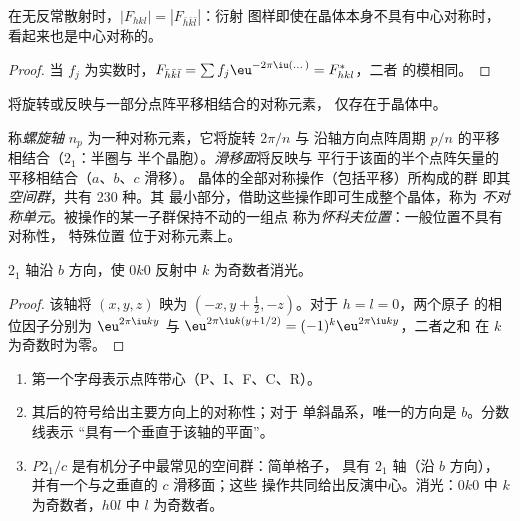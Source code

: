 \begin{proposition}[弗里德尔定律]\label{prop:b3:x-ray-diffraction:friedel}
在无反常散射时，$|F_{hkl}| = |F_{\bar h\bar k\bar l}|$：衍射
图样即使在晶体本身不具有中心对称时，看起来也是中心对称的。
\end{proposition}

\begin{proof}
当 $f_j$ 为实数时，$F_{\bar h\bar k\bar l} = \sum f_j\eu^{-2\pi\iu(\dots)} = F_{hkl}^*$，二者
的模相同。
\end{proof}

将旋转或反映与一部分点阵平移相结合的对称元素，
仅存在于晶体中。

\begin{definition}\label{def:b3:x-ray-diffraction:space-group}
称\emph{螺旋轴} $n_p$ 为一种对称元素，它将旋转 $2\pi/n$ 与
沿轴方向点阵周期 $p/n$ 的平移相结合（$2_1$：半圈与
半个晶胞）。\emph{滑移面}将反映与
平行于该面的半个点阵矢量的平移相结合（$a$、$b$、$c$ 滑移）。
晶体的全部对称操作（包括平移）所构成的群
即其\emph{空间群}，共有 230 种。其
最小部分，借助这些操作即可生成整个晶体，称为
\emph{不对称单元}。被操作的某一子群保持不动的一组点
称为\emph{怀科夫位置}：一般位置不具有对称性，
特殊位置
位于对称元素上。
\end{definition}

\begin{proposition}[螺旋轴的消光]\label{prop:b3:x-ray-diffraction:screw-absence}
$2_1$ 轴沿 $b$ 方向，使 $0k0$ 反射中 $k$ 为奇数者消光。
\end{proposition}

\begin{proof}
该轴将 $(x, y, z)$ 映为 $(-x, y + \frac12, -z)$。对于 $h = l = 0$，两个原子
的相位因子分别为 $\eu^{2\pi\iu ky}$ 与 $\eu^{2\pi\iu k(y + 1/2)} = (-1)^k\eu^{2\pi\iu ky}$，二者之和
在 $k$ 为奇数时为零。
\end{proof}

\begin{method}[读取空间群符号]\label{met:b3:x-ray-diffraction:read-space-group}
\begin{enumerate}
  \item 第一个字母表示点阵带心（P、I、F、C、R）。
  \item 其后的符号给出主要方向上的对称性；对于
        单斜晶系，唯一的方向是 $b$。分数线表示
        “具有一个垂直于该轴的平面”。
  \item \textit{P}$2_1/c$ 是有机分子中最常见的空间群：简单格子，
        具有 $2_1$ 轴（沿 $b$ 方向），并有一个与之垂直的 $c$ 滑移面；这些
        操作共同给出反演中心。消光：$0k0$ 中 $k$ 为奇数者，$h0l$ 中
        $l$ 为奇数者。
\end{enumerate}
\end{method}

